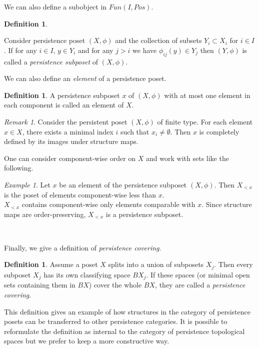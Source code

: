 \documentclass[english,12pt]{article}
\newcounter{stmcounter}[section]
\numberwithin{equation}{section}
\theoremstyle{definition}
\newtheorem{definition}[stmcounter]{Definition}
\theoremstyle{remark}
\newtheorem{remark}[stmcounter]{Remark}
\newtheorem{example}[stmcounter]{Example}
\newcommand{\define}[1]{{\textit{#1}}}
\begin{document}
We can also define a subobject in $Fun(I, Pos)$.

\begin{definition} ~ \par
  Consider persistence poset $(X,\phi)$ and the collection of subsets $Y_i \subset X_i$ for $i \in I$.
  If for any $i \in I$, $y \in Y_i$ and for any $j>i$ we have $\phi_{ij}(y) \in Y_j$ then $(Y,\phi)$ is called a \define{persistence subposet} of $(X,\phi)$.
\end{definition}

We can also define an \define{element} of a persistence poset.
\begin{definition}
  A persistence subposet $x$ of $(X,\phi)$ with at most one element in each component is called an element of $X$.
\end{definition}

\begin{remark}
  Consider the persistent poset $(X, \phi)$ of finite type. For each element $x \in X$, there exists a minimal index $i$ such that $x_i \neq \emptyset$. Then $x$ is completely defined by its images under structure maps.
\end{remark}

One can consider component-wise order on $X$ and work with sets like the following.
\begin{example}
  Let $x$ be an element of the persistence subposet $(X, \phi)$. Then $X_{<x}$ is the poset of elements component-wise less than $x$.\\

  $X_{<x}$ contains component-wise only elements comparable with $x$. Since structure maps are order-preserving, $X_{<x}$ is a persistence subposet.
\end{example} ~ \par

Finally, we give a definition of \define{persistence covering}.\\

\begin{definition}
  Assume a poset $X$ splits into a union of subposets $X_j$. Then every subposet $X_j$ has its own classifying space $BX_j$. If these spaces (or minimal open sets containing them in $BX$) cover the whole $BX$, they are called a \define{persistence covering}.
\end{definition}

This definition gives an example of how structures in the category of persistence posets can be transferred to other persistence categories. It is possible to reformulate the definition as internal to the category of persistence topological spaces but we prefer to keep a more constructive way.
\end{document}
